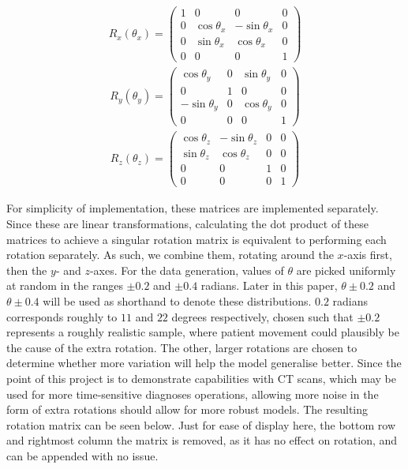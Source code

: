 \begin{align*}
  R_x(\theta_x) =
  \begin{pmatrix}
    1 & 0 & 0 & 0 \\
    0 & \cos\theta_x & -\sin\theta_x & 0 \\
    0 & \sin\theta_x & \cos\theta_x & 0 \\
    0 & 0 & 0 & 1
  \end{pmatrix}
\end{align*}
\begin{align*}
  R_y(\theta_y) =
  \begin{pmatrix}
    \cos\theta_y & 0 & \sin\theta_y & 0 \\
    0 & 1 & 0 & 0 \\
    -\sin\theta_y & 0 & \cos\theta_y & 0 \\
    0 & 0 & 0 & 1
  \end{pmatrix}
\end{align*}
\begin{align*}
  R_z(\theta_z) =
  \begin{pmatrix}
    \cos\theta_z & -\sin\theta_z & 0 & 0 \\
    \sin\theta_z & \cos\theta_z & 0 & 0 \\
    0 & 0 & 1 & 0 \\
    0 & 0 & 0 & 1
  \end{pmatrix}
\end{align*}

For simplicity of implementation, these matrices are implemented separately. Since these are linear transformations, calculating the dot product of these matrices to achieve a singular rotation matrix is equivalent to performing each rotation separately. As such, we combine them, rotating around the $x$-axis first, then the $y$- and $z$-axes. For the data generation, values of $\theta$ are picked uniformly at random in the ranges $\pm0.2$ and $\pm0.4$ radians. Later in this paper, $\theta\pm0.2$ and $\theta\pm0.4$ will be used as shorthand to denote these distributions. $0.2$ radians corresponds roughly to $11$ and $22$ degrees respectively, chosen such that $\pm0.2$ represents a roughly realistic sample, where patient movement could plausibly be the cause of the extra rotation. The other, larger rotations are chosen to determine whether more variation will help the model generalise better. Since the point of this project is to demonstrate capabilities with CT scans, which may be used for more time-sensitive diagnoses operations, allowing more noise in the form of extra rotations should allow for more robust models. The resulting rotation matrix can be seen below. Just for ease of display here, the bottom row and rightmost column the matrix is removed, as it has no effect on rotation, and can be appended with no issue.

